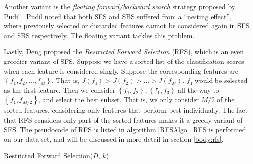 \documentclass[12pt, twoside, a4paper]{report}
\begin{document}
Another variant is the \textit{floating forward/backward search} strategy proposed by Pudil \cite{RefWorks:178}. Pudil noted that both SFS and SBS suffered from a ``nesting effect'', where previously selected or discarded features cannot be considered again in SFS and SBS respectively. The floating variant tackles this problem.

Lastly, Deng \cite{deng1998omega} proposed the \textit{Restricted Forward Selection} (RFS), which is an even greedier variant of SFS. Suppose we have a sorted list of the classification scores when each feature is considered singly. Suppose the corresponding features are $\left\lbrace f_1, f_2, \dots , f_M \right\rbrace$. That is, $J(f_1) > J(f_2) > \dots > J(f_M)$. $f_1$ would be selected as the first feature. Then we consider $\left\lbrace f_1, f_2 \right\rbrace, \left\lbrace f_1, f_3 \right\rbrace$ all the way to $\left\lbrace f_1, f_{M/2} \right\rbrace$, and select the best subset. That is, we only consider $M/2$ of the sorted features, considering only features that perform best individually. The fact that RFS considers only part of the sorted features makes it a greedy variant of SFS. The pseudocode of RFS is listed in algorithm \ref{RFSAlgo}. RFS is performed on our data set, and will be discussed in more detail in section \ref{body:rfs}.


\begin{algorithm}
\DontPrintSemicolon
{}
\BlankLine
{}
\caption{Restricted Forward Selection($D$, $k$) \label{RFSAlgo}}
\end{algorithm}
\end{document}
